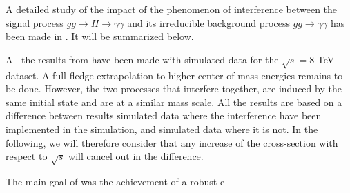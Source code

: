 A detailed study of the impact of the phenomenon of interference between the signal process $gg \rightarrow H \rightarrow \gamma\gamma$ and its irreducible background process $gg \rightarrow \gamma\gamma$ has been made in \cite{ATL-PHYS-PUB-2016-009}. It will be summarized below.

All the results from \cite{ATL-PHYS-PUB-2016-009} have been made with simulated data for the $\sqrt{s} = 8$ TeV dataset. A full-fledge extrapolation to higher center of mass energies remains to be done. However, the two processes that interfere together, are induced by the same initial state and are at a similar mass scale. All the results are based on a difference between results simulated data where the interference have been implemented in the simulation, and simulated data where it is not. In the following, we will therefore consider that any increase of the cross-section with respect to $\sqrt{s}$ will cancel out in the difference.

The main goal of \cite{ATL-PHYS-PUB-2016-009} was the achievement of a robust e